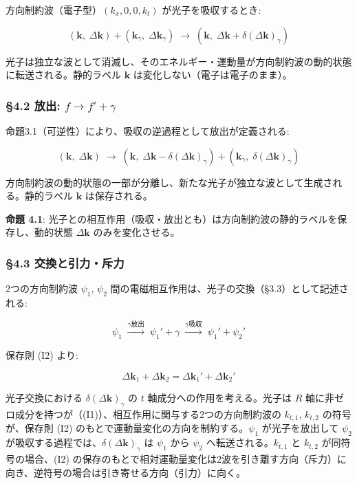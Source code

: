 \documentclass[
  a4paper,11pt]{ltjsarticle}
\theoremstyle{definition}
\theoremstyle{remark}
\begin{document}
方向制約波（電子型）\((k_x, 0, 0, k_t)\) が光子を吸収するとき:

\[(\mathbf{k},\; \Delta\mathbf{k}) + (\mathbf{k}_\gamma,\; \Delta\mathbf{k}_\gamma) \;\longrightarrow\; (\mathbf{k},\; \Delta\mathbf{k} + \delta(\Delta\mathbf{k})_\gamma)\]

光子は独立な波として消滅し、そのエネルギー・運動量が方向制約波の動的状態に転送される。静的ラベル
\(\mathbf{k}\) は変化しない（電子は電子のまま）。

\subsubsection{\texorpdfstring{§4.2 放出:
\(f \to f' + \gamma\)}{§4.2 放出: f \textbackslash to f\textquotesingle{} + \textbackslash gamma}}\label{ux653eux51fa-f-to-f-gamma}

命題3.1（可逆性）により、吸収の逆過程として放出が定義される:

\[(\mathbf{k},\; \Delta\mathbf{k}) \;\longrightarrow\; (\mathbf{k},\; \Delta\mathbf{k} - \delta(\Delta\mathbf{k})_\gamma) + (\mathbf{k}_\gamma,\; \delta(\Delta\mathbf{k})_\gamma)\]

方向制約波の動的状態の一部が分離し、新たな光子が独立な波として生成される。静的ラベル
\(\mathbf{k}\) は保存される。

\textbf{命題 4.1}:
光子との相互作用（吸収・放出とも）は方向制約波の静的ラベルを保存し、動的状態
\(\Delta\mathbf{k}\) のみを変化させる。

\subsubsection{§4.3
交換と引力・斥力}\label{ux4ea4ux63dbux3068ux5f15ux529bux65a5ux529b}

2つの方向制約波 \(\psi_1\), \(\psi_2\)
間の電磁相互作用は、光子の交換（§3.3）として記述される:

\[\psi_1 \;\xrightarrow{\gamma\text{放出}}\; \psi_1' + \gamma \;\xrightarrow{\gamma\text{吸収}}\; \psi_1' + \psi_2'\]

保存則 (I2) より:

\[\Delta\mathbf{k}_1 + \Delta\mathbf{k}_2 = \Delta\mathbf{k}_1' + \Delta\mathbf{k}_2'\]

光子交換における \(\delta(\Delta\mathbf{k})_\gamma\) の \(t\)
軸成分への作用を考える。光子は \(R\)
軸に非ゼロ成分を持つが（(I1)）、相互作用に関与する2つの方向制約波の
\(k_{t,1}\), \(k_{t,2}\) の符号が、保存則 (I2)
のもとで運動量変化の方向を制約する。\(\psi_1\) が光子を放出して
\(\psi_2\) が吸収する過程では、\(\delta(\Delta\mathbf{k})_\gamma\) は
\(\psi_1\) から \(\psi_2\) へ転送される。\(k_{t,1}\) と \(k_{t,2}\)
が同符号の場合、(I2)
の保存のもとで相対運動量変化は2波を引き離す方向（斥力）に向き、逆符号の場合は引き寄せる方向（引力）に向く。
\end{document}
